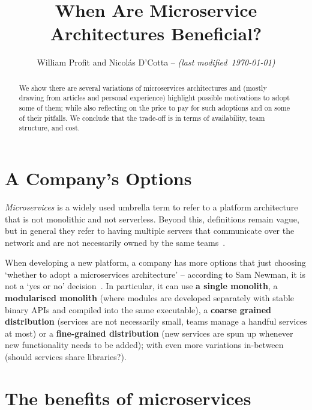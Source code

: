 \documentclass[conference]{IEEEtran}
\title{When Are Microservice Architectures Beneficial?}
\begin{document}
    \author{William Profit and Nicolás D'Cotta --
     \emph{(last modified~\today)}}

    \maketitle

    \begin{abstract}
        We show there are several variations of microservices architectures and (mostly drawing from articles and personal experience) highlight possible motivations to adopt
        some of them; while also reflecting on the price to pay for such adoptions and on some of
        their pitfalls. We conclude that the trade-off is in terms of availability, team structure, and cost.
    \end{abstract}


    \section{A Company's Options}

    \emph{Microservices} is a widely used umbrella term to refer to a platform architecture that is not monolithic and not serverless.
    Beyond this, definitions remain vague, but in general they refer to having multiple servers that communicate over the network and are not necessarily owned by the same teams~\cite{awsMicroServicesDef}.

    When developing a new platform, a company has more options that just choosing `whether to adopt a microservices architecture' -- according to Sam Newman, it is not a `yes or no' decision~\cite{microservicesNotBinary}.
    In particular, it can use \textbf{a single monolith}, a \textbf{modularised monolith} (where modules are developed separately with stable binary APIs and compiled into the same executable), a \textbf{coarse grained distribution} (services are not necessarily small, teams manage a handful services at most) or a
    \textbf{fine-grained distribution} (new services are spun up whenever new functionality needs to be added);
    with even more variations in-between (should services share libraries?).


    \section{The benefits of microservices}
\end{document}
